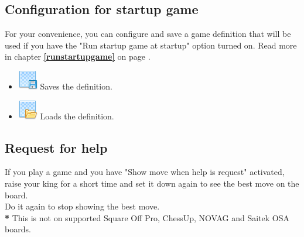 \documentclass[11pt,a4paper]{article}
\begin{document}
\subsection{Configuration for startup game} \label{startupgame}

For your convenience, you can configure and save a game definition that will be used if you have the "Run startup game at startup" option turned on.  Read more in chapter \textbf{\ref{runstartupgame}  } on page \pageref{runstartupgame}.

\begin{itemize}
	  \item \includegraphics[scale=0.5]{layer_save.png} Saves the definition.
  	  \item \includegraphics[scale=0.5]{layer_open.png} Loads the definition.
\end{itemize}


\subsection{Request for help}
If you play a game and you have "Show move when help is request" activated, raise your king for a short time and set it down again to see the best move on the board.\\
Do it again to stop showing the best move.\\
{\color{red}\textbf{*}} This is not on supported Square Off Pro, ChessUp, NOVAG and Saitek OSA boards.
\end{document}
